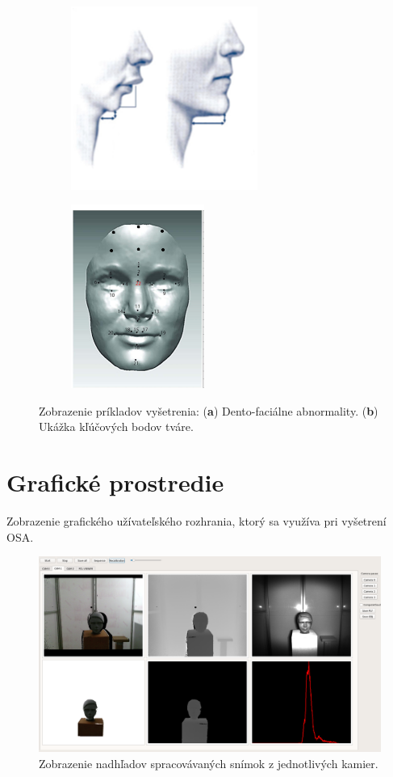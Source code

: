 \begin{figure}[!h]
	\centering
	\begin{subfigure}[b]{0.45\textwidth}
		\centering
		\includegraphics[height=6cm]{figures/dotaznik_3.png}
		\caption{}
		\label{fig:dotaznik:b}
	\end{subfigure}
	\begin{subfigure}[b]{0.45\textwidth}
		\centering
		\includegraphics[height=6cm]{figures/dotaznik_4.png}
		\caption{}
		\label{fig:dotaznik:c}
	\end{subfigure}
	\caption{Zobrazenie príkladov vyšetrenia: (\textbf{a}) Dento-faciálne abnormality. (\textbf{b}) Ukážka kľúčových bodov tváre. }
	\label{fig:dotaznik}
\end{figure}


\newpage
\section{Grafické prostredie} \label{sec:Priloha:HMI}
Zobrazenie grafického užívateľského rozhrania, ktorý sa využíva pri vyšetrení OSA.

\begin{figure}[H]
	\centering
	\includegraphics[width=\textwidth]{figures/hmi.png}
	\caption{Zobrazenie nadhľadov spracovávaných snímok z jednotlivých kamier.}
	\label{fig:hmi:a}
\end{figure}

